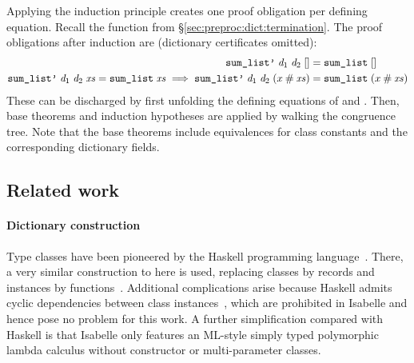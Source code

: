 Applying the induction principle creates one proof obligation per defining equation.%
Recall the  function from §\ref{sec:preproc:dict:termination}.
The proof obligations after induction are (dictionary certificates omitted):
\begin{align*}
  \texttt{\textup{sum\_list'}}\;\mathit{d}_1\;\mathit{d}_2\;[] &= \texttt{\textup{sum\_list}}\;[] \\
  \texttt{\textup{sum\_list'}}\;\mathit{d}_1\;\mathit{d}_2\;\mathit{xs} = \texttt{\textup{sum\_list}}\;\mathit{xs} \implies \texttt{\textup{sum\_list'}}\;\mathit{d}_1\;\mathit{d}_2\;(x\mathbin{\mathtt{\#}}\mathit{xs}) &= \texttt{\textup{sum\_list}}\;(x\mathbin{\mathtt{\#}}\mathit{xs})
\end{align*}
These can be discharged by first unfolding the defining equations of  and .
Then, base theorems and induction hypotheses are applied by walking the congruence tree.
Note that the base theorems include equivalences for class constants and the corresponding dictionary fields.


\subsection{Related work}
\label{sec:preproc:dict:related}

\paragraph{Dictionary construction}
Type classes have been pioneered by the Haskell programming language~\cite{morris2013classes,wadler1989adhoc}.
There, a very similar construction to here is used, replacing classes by records and instances by functions~\cite{peternson1993typeclasses,augustsson1993overloading,chen1992parametric}.
Additional complications arise because Haskell admits cyclic dependencies between class instances~\cite{laemmel2005syb}, which are prohibited in Isabelle and hence pose no problem for this work.
A further simplification compared with Haskell is that Isabelle only features an ML-style simply typed polymorphic lambda calculus without constructor or multi-parameter classes.

